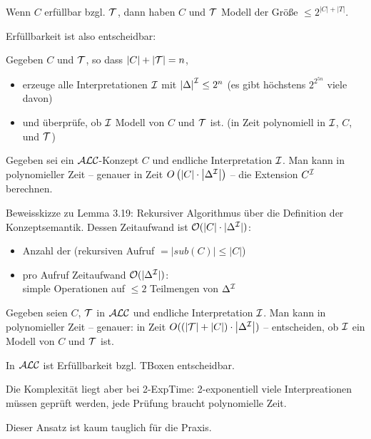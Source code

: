Wenn $C$ erfüllbar bzgl. $\mathcal{T}$, dann haben $C$ und $\mathcal{T}$ Modell der
Größe $\leq 2^{\left| C \right| + \left| T \right|}$.

Erfüllbarkeit ist also entscheidbar:

Gegeben $C$ und $\mathcal{T}$, so dass $|C|+|\mathcal{T}| = n$,
\begin{itemize} 
  \item erzeuge alle Interpretationen $\mathcal{I}$ mit $\left| \Delta \right|^{\mathcal{I}} \leq 2^{n}$ (es gibt höchstens $2^{2^{5n}}$ viele davon) 
  \item und überprüfe, ob $\mathcal{I}$ Modell von $C$ und $\mathcal{T}$ ist. (in Zeit polynomiell in $\mathcal{I}$, $C$, und $\mathcal{T}$)
\end{itemize}

\begin{lemma}
Gegeben sei ein $\mathcal{A}\mathcal{L}\mathcal{C}$-Konzept $C$ und endliche Interpretation $\mathcal{I}$. Man kann in polynomieller Zeit -- genauer in Zeit $O\left( \left| C \right| \cdot \left| \Delta^{\mathcal{I}} \right| \right)$ -- die Extension $C^{\mathcal{I}}$ berechnen.
\end{lemma}

Beweisskizze zu Lemma 3.19: Rekursiver Algorithmus über die Definition der Konzeptsemantik. Dessen Zeitaufwand ist $\mathcal{O}(|C| \cdot |\Delta^{\mathcal{I}}|)$:

\begin{itemize}
  \item Anzahl der (rekursiven Aufruf $= |sub(C)| \leq |C|$)
  \item pro Aufruf Zeitaufwand $\mathcal{O}(|\Delta^{\mathcal{I}}|)$: \\
  simple Operationen auf $\leq 2$ Teilmengen von $\Delta^{\mathcal{I}}$
\end{itemize}

\begin{korollar}
Gegeben seien $C$, $\mathcal{T}$ in $\mathcal{A}\mathcal{L}\mathcal{C}$ und endliche Interpretation $\mathcal{I}$. Man kann in polynomieller Zeit -- genauer: in Zeit $O(\left( \left| \mathcal{T} \right| + \left| C \right| \right) \cdot \left| \Delta^{\mathcal{I}} \right|)$ -- entscheiden, ob $\mathcal{I}$ ein Modell von $C$ und $\mathcal{T}$ ist.
\end{korollar}

\begin{theorem}
In $\mathcal{A}\mathcal{L}\mathcal{C}$ ist Erfüllbarkeit bzgl. TBoxen entscheidbar.
\end{theorem}

Die Komplexität liegt aber bei 2-ExpTime: 2-exponentiell viele Interpreationen müssen geprüft werden, jede Prüfung braucht polynomielle Zeit.

Dieser Ansatz ist kaum tauglich für die Praxis.
